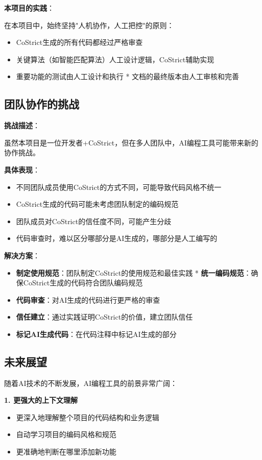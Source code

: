 ﻿\documentclass[12pt,a4paper]{article}
\begin{document}
\textbf{本项目的实践}：

在本项目中，始终坚持"人机协作，人工把控"的原则：
\begin{itemize}
    \item CoStrict生成的所有代码都经过严格审查
    \item 关键算法（如智能匹配算法）人工设计逻辑，CoStrict辅助实现
    \item 重要功能的测试由人工设计和执行
    * 文档的最终版本由人工审核和完善
\end{itemize}

\subsection{团队协作的挑战}

\textbf{挑战描述}：

虽然本项目是一位开发者+CoStrict，但在多人团队中，AI编程工具可能带来新的协作挑战。

\textbf{具体表现}：
\begin{itemize}
    \item 不同团队成员使用CoStrict的方式不同，可能导致代码风格不统一
    \item CoStrict生成的代码可能未考虑团队制定的编码规范
    \item 团队成员对CoStrict的信任度不同，可能产生分歧
    \item 代码审查时，难以区分哪部分是AI生成的，哪部分是人工编写的
\end{itemize}

\textbf{解决方案}：

\begin{itemize}
    \item \textbf{制定使用规范}：团队制定CoStrict的使用规范和最佳实践
    * \textbf{统一编码规范}：确保CoStrict生成的代码符合团队编码规范
    \item \textbf{代码审查}：对AI生成的代码进行更严格的审查
    \item \textbf{信任建立}：通过实践证明CoStrict的价值，建立团队信任
    \item \textbf{标记AI生成代码}：在代码注释中标记AI生成的部分
\end{itemize}

\subsection{未来展望}

随着AI技术的不断发展，AI编程工具的前景非常广阔：

\textbf{1. 更强大的上下文理解}
\begin{itemize}
    \item 更深入地理解整个项目的代码结构和业务逻辑
    \item 自动学习项目的编码风格和规范
    \item 更准确地判断在哪里添加新功能
\end{itemize}
\end{document}
